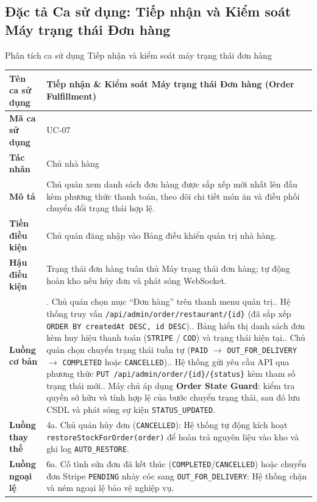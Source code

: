 \documentclass{uetgraduation}
\begin{document}
\clearpage
\subsection{Đặc tả Ca sử dụng: Tiếp nhận và Kiểm soát Máy trạng thái Đơn hàng}
\begin{table}[!htbp]{Phân tích ca sử dụng Tiếp nhận và kiểm soát máy trạng thái đơn hàng}
\centering
\small
\begin{tabularx}{\textwidth}{|l|>{\raggedright\arraybackslash}X|}
\hline
\textbf{Tên ca sử dụng} & \textbf{Tiếp nhận \& Kiểm soát Máy trạng thái Đơn hàng (Order Fulfillment)} \\ \hline
\textbf{Mã ca sử dụng} & UC-07 \\ \hline
\textbf{Tác nhân} & Chủ nhà hàng \\ \hline
\textbf{Mô tả} & Chủ quán xem danh sách đơn hàng được sắp xếp mới nhất lên đầu kèm phương thức thanh toán, theo dõi chi tiết món ăn và điều phối chuyển đổi trạng thái hợp lệ. \\ \hline
\textbf{Tiền điều kiện} & Chủ quán đăng nhập vào Bảng điều khiển quản trị nhà hàng. \\ \hline
\textbf{Hậu điều kiện} & Trạng thái đơn hàng tuân thủ Máy trạng thái đơn hàng; tự động hoàn kho nếu hủy đơn và phát sóng WebSocket. \\ \hline
\textbf{Luồng cơ bản} & 
1. Chủ quán chọn mục ``Đơn hàng'' trên thanh menu quản trị.\newline
2. Hệ thống truy vấn \texttt{/api/admin/order/restaurant/\{id\}} (đã sắp xếp \texttt{ORDER BY createdAt DESC, id DESC}).\newline
3. Bảng hiển thị danh sách đơn kèm huy hiệu thanh toán (\texttt{STRIPE} / \texttt{COD}) và trạng thái hiện tại.\newline
4. Chủ quán chọn chuyển trạng thái tuần tự (\texttt{PAID} $\to$ \texttt{OUT\_FOR\_DELIVERY} $\to$ \texttt{COMPLETED} hoặc \texttt{CANCELLED}).\newline
5. Hệ thống gửi yêu cầu API qua phương thức \texttt{PUT /api/admin/order/\{id\}/\{status\}} kèm tham số trạng thái mới.\newline
6. Máy chủ áp dụng \textbf{Order State Guard}: kiểm tra quyền sở hữu và tính hợp lệ của bước chuyển trạng thái, sau đó lưu CSDL và phát sóng sự kiện \texttt{STATUS\_UPDATED}. \\ \hline
\textbf{Luồng thay thế} & 
4a. Chủ quán hủy đơn (\texttt{CANCELLED}): Hệ thống tự động kích hoạt \texttt{restoreStockForOrder(order)} để hoàn trả nguyên liệu vào kho và ghi log \texttt{AUTO\_RESTORE}. \\ \hline
\textbf{Luồng ngoại lệ} & 
6a. Cố tình sửa đơn đã kết thúc (\texttt{COMPLETED}/\texttt{CANCELLED}) hoặc chuyển đơn Stripe \texttt{PENDING} nhảy cóc sang \texttt{OUT\_FOR\_DELIVERY}: Hệ thống chặn và ném ngoại lệ bảo vệ nghiệp vụ. \\ \hline
\end{tabularx}
\end{table}
\end{document}
